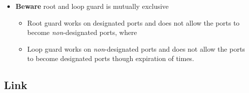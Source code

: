 \begin{itemize}
\begin{itemize}
    \end{itemize}
    \item \textbf{Beware} root and loop guard is mutually exclusive
    \begin{itemize}
        \item Root guard works on designated ports and does not allow the ports to become \textit{non}-designated ports, where
        \item Loop guard works on \textit{non}-designated ports and does not allow the ports to become designated ports {\footnotesize though expiration of times}.
    \end{itemize}
\end{itemize}

\subsection{Link}

